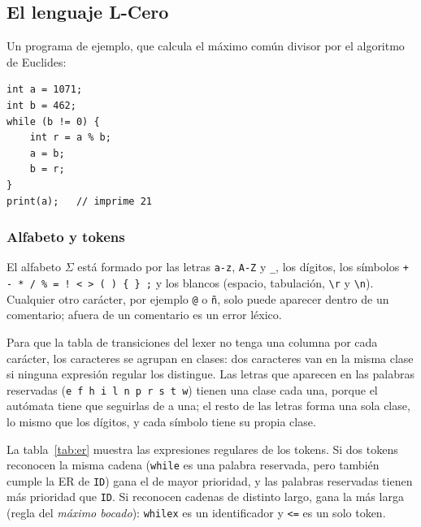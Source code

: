 \documentclass[11pt,a4paper]{article}
\theoremstyle{definition}
\newcommand{\tm}[1]{\texttt{#1}}
\renewcommand{\paragraph}[1]{\subsubsection*{#1}}
\begin{document}
\subsection{El lenguaje L-Cero}

Un programa de ejemplo, que calcula el máximo común divisor por el algoritmo
de Euclides:

\begin{Verbatim}
int a = 1071;
int b = 462;
while (b != 0) {
    int r = a % b;
    a = b;
    b = r;
}
print(a);   // imprime 21
\end{Verbatim}

\paragraph{Alfabeto y tokens}

El alfabeto $\Sigma$ está formado por las letras \tm{a-z}, \tm{A-Z} y
\tm{\_}, los dígitos, los símbolos \tm{+ - * / \% = ! < > ( ) \{ \} ;} y los
blancos (espacio, tabulación, \tm{\textbackslash r} y \tm{\textbackslash n}).
Cualquier otro carácter, por ejemplo \tm{@} o \tm{ñ}, solo puede aparecer
dentro de un comentario; afuera de un comentario es un error léxico.

Para que la tabla de transiciones del lexer no tenga una columna por cada
carácter, los caracteres se agrupan en \NClases{} clases: dos caracteres van
en la misma clase si ninguna expresión regular los distingue. Las letras que
aparecen en las palabras reservadas (\tm{e f h i l n p r s t w}) tienen una
clase cada una, porque el autómata tiene que seguirlas de a una; el resto de
las letras forma una sola clase, lo mismo que los dígitos, y cada símbolo
tiene su propia clase.

La tabla~\ref{tab:er} muestra las expresiones regulares de los tokens. Si
dos tokens reconocen la misma cadena (\tm{while} es una palabra reservada,
pero también cumple la ER de \tm{ID}) gana el de mayor prioridad, y las
palabras reservadas tienen más prioridad que \tm{ID}. Si reconocen cadenas
de distinto largo, gana la más larga (regla del \emph{máximo bocado}):
\tm{whilex} es un identificador y \tm{<=} es un solo token.
\end{document}
